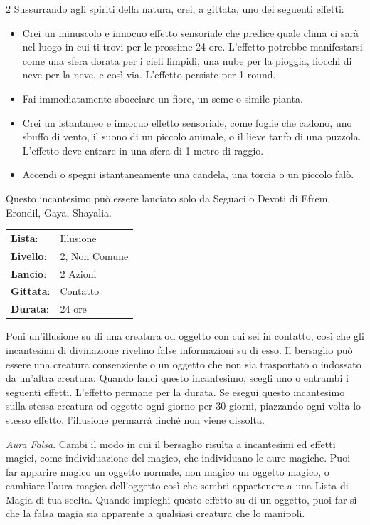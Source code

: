 \begin{multicols}{2}
Sussurrando agli spiriti della natura, crei, a gittata, uno dei seguenti effetti:

\begin{itemize}[leftmargin=*] \setlength{\itemsep}{0pt}
	\item Crei un minuscolo e innocuo effetto sensoriale che predice quale clima ci sarà nel luogo in cui ti trovi per le prossime 24 ore. L'effetto potrebbe manifestarsi come una sfera dorata per i cieli limpidi, una nube per la pioggia, fiocchi di neve per la neve, e così via. L'effetto persiste per 1 round.
	\item Fai immediatamente sbocciare un fiore, un seme o simile pianta.
	\item Crei un istantaneo e innocuo effetto sensoriale, come foglie che cadono, uno sbuffo di vento, il suono di un piccolo animale, o il lieve tanfo di una puzzola. L'effetto deve entrare in una sfera di 1 metro di raggio.
	\item Accendi o spegni istantaneamente una candela, una torcia o un piccolo falò.
\end{itemize}

Questo incantesimo può essere lanciato solo da Seguaci o Devoti di Efrem, Erondil, Gaya, Shayalia.

\noindent\begin{tabularx}{\linewidth}{p{1.9cm}X}
	\rowcolor{gray!20}\textbf{Lista}: & Illusione \\
	\textbf{Livello}: & 2, Non Comune \\
	\rowcolor{gray!20}\textbf{Lancio}: & 2 Azioni \\
	\textbf{Gittata}: & Contatto \\
	\rowcolor{gray!20}\textbf{Durata}: & 24 ore \\
\end{tabularx}\smallskip

Poni un'illusione su di una creatura od oggetto con cui sei in contatto, così che gli incantesimi di divinazione rivelino false informazioni su di esso. Il bersaglio può essere una creatura consenziente o un oggetto che non sia trasportato o indossato da un'altra creatura. Quando lanci questo incantesimo, scegli uno o entrambi i seguenti effetti. L'effetto permane per la durata. Se esegui questo incantesimo sulla stessa creatura od oggetto ogni giorno per 30 giorni, piazzando ogni volta lo stesso effetto, l'illusione permarrà finché non viene dissolta.

\emph{Aura Falsa}. Cambi il modo in cui il bersaglio risulta a incantesimi ed effetti magici, come individuazione del magico, che individuano le aure magiche. Puoi far apparire magico un oggetto normale, non magico un oggetto magico, o cambiare l'aura magica dell'oggetto così che sembri appartenere a una Lista di Magia di tua scelta. Quando impieghi questo effetto su di un oggetto, puoi far sì che la falsa magia sia apparente a qualsiasi creatura che lo manipoli.


\end{multicols}
